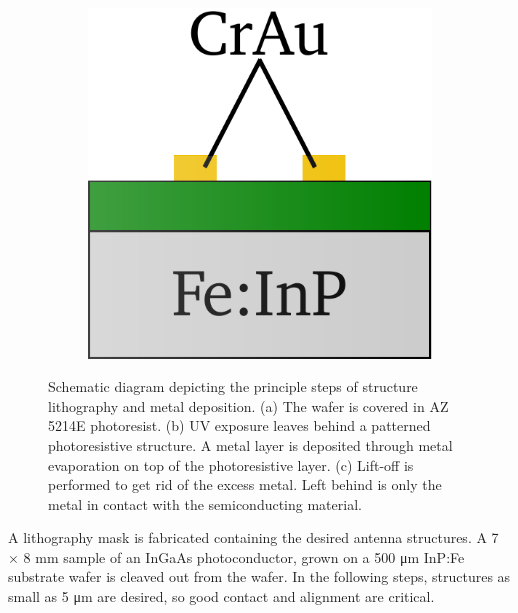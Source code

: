 \begin{figure}[!]
\begin{subfigure}[b]{0.21\textwidth}
        \caption{\centering}
        \label{fig:fab12}
    \end{subfigure}
    \hfill
    \begin{subfigure}[b]{0.21\textwidth}
        \centering
        \includegraphics[width=\textwidth]{figures/Fabrication/fab1_3.pdf}
        \caption{\centering}
        \label{fig:fab13}
    \end{subfigure}
    \caption{Schematic diagram depicting the principle steps of structure lithography and metal deposition. (a) The wafer is covered in AZ 5214E photoresist. (b) UV exposure leaves behind a patterned photoresistive structure. A metal layer is deposited through metal evaporation on top of the photoresistive layer. (c) Lift-off is performed to get rid of the excess metal. Left behind is only the metal in contact with the semiconducting material.}
\end{figure}

A lithography mask is fabricated containing the desired antenna structures. A \num{7} $\times$ \num{8} \si{\milli\meter} sample of an InGaAs photoconductor, grown on a \num{500} \si{\micro\meter} InP:Fe substrate wafer is cleaved out from the wafer. In the following steps, structures as small as \num{5} \si{\micro\meter} are desired, so good contact and alignment are critical.

